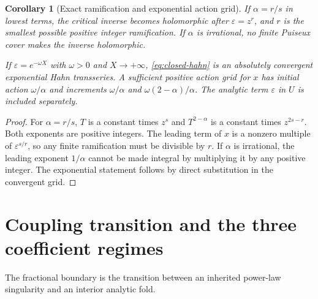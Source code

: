 \documentclass[11pt,a4paper]{article}
\numberwithin{equation}{section}
\newtheorem{corollary}[theorem]{Corollary}
\theoremstyle{definition}
\theoremstyle{remark}
\begin{document}
\begin{corollary}[Exact ramification and exponential action grid]
\label{cor:ramification}
If $\alpha=r/s$ in lowest terms, the critical inverse becomes holomorphic
after $\varepsilon=z^r$, and $r$ is the smallest possible positive integer
ramification. If $\alpha$ is irrational, no finite Puiseux cover makes
the inverse holomorphic.

If $\varepsilon=e^{-\omega X}$ with $\omega>0$ and $X\to+\infty$,
\eqref{eq:closed-hahn} is an absolutely convergent exponential Hahn
transseries. A sufficient positive action grid for $x$ has initial action
$\omega/\alpha$ and increments $\omega/\alpha$ and
$\omega(2-\alpha)/\alpha$. The analytic term $\varepsilon$ in $U$ is
included separately.
\end{corollary}
\begin{proof}
For $\alpha=r/s$, $T$ is a constant times $z^s$ and $T^{2-\alpha}$ is a
constant times $z^{2s-r}$. Both exponents are positive integers. The
leading term of $x$ is a nonzero multiple of $\varepsilon^{s/r}$, so any
finite ramification must be divisible by $r$. If $\alpha$ is irrational,
the leading exponent $1/\alpha$ cannot be made integral by multiplying
it by any positive integer. The exponential statement follows by direct
substitution in the convergent grid.
\end{proof}

\section{Coupling transition and the three coefficient regimes}
\label{sec:phase}

The fractional boundary is the transition between an inherited
power-law singularity and an interior analytic fold.
\end{document}
